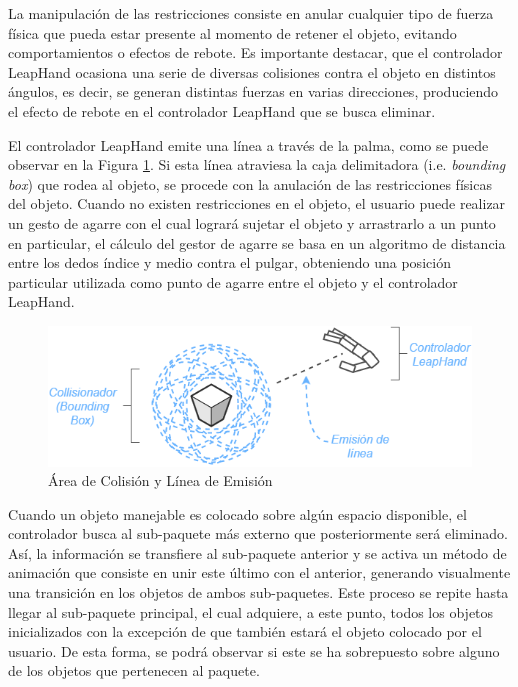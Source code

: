 \documentclass[conference]{IEEEtran}
\begin{document}
La manipulación de las restricciones consiste en anular cualquier tipo de fuerza física que pueda estar presente al momento de retener el objeto, evitando comportamientos o efectos de rebote. Es importante destacar, que el controlador LeapHand ocasiona una serie de diversas colisiones contra el objeto en distintos ángulos, es decir, se generan distintas fuerzas en varias direcciones, produciendo el efecto de rebote en el controlador LeapHand que se busca eliminar.

El controlador LeapHand emite una línea a través de la palma, como se puede observar en la Figura \ref{fig:colision}. Si esta línea atraviesa la caja delimitadora (i.e. \textit{bounding box}) que rodea al objeto, se procede con la anulación de las restricciones físicas del objeto. Cuando no existen restricciones en el objeto, el usuario puede realizar un gesto de agarre con el cual logrará sujetar el objeto y arrastrarlo a un punto en particular, el cálculo del gestor de agarre se basa en un algoritmo de distancia entre los dedos índice y medio contra el pulgar, obteniendo una posición particular utilizada como punto de agarre entre el objeto y el controlador LeapHand.

\begin{figure}[htpb!]
 \centering 
\includegraphics[width=1.0\columnwidth]{images/colision.png}
\caption{Área de Colisión y Línea de Emisión}
\label{fig:colision}
\end{figure}

Cuando un objeto manejable es colocado sobre algún espacio disponible, el controlador busca al sub-paquete más externo que posteriormente será eliminado. Así, la información se transfiere al sub-paquete anterior y se activa un método de animación que consiste en unir este último con el anterior, generando visualmente una transición en los objetos de ambos sub-paquetes. Este proceso se repite hasta llegar al sub-paquete principal, el cual adquiere, a este punto, todos los objetos inicializados con la excepción de que también estará el objeto colocado por el usuario. De esta forma, se podrá observar si este se ha sobrepuesto sobre alguno de los objetos que pertenecen al paquete.
\end{document}
